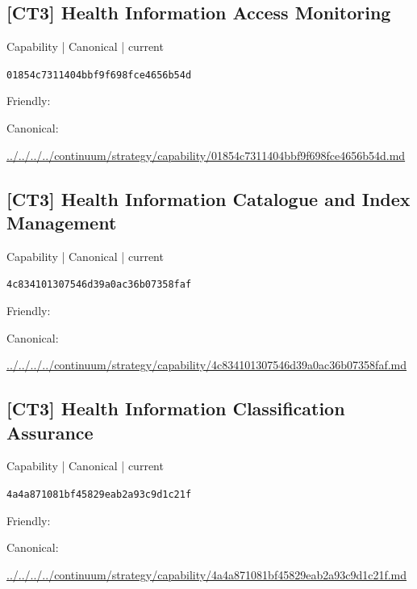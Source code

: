 \documentclass[10pt,a4paper]{article}
\begin{document}
\subsection*{[CT3] Health Information Access Monitoring}
{\small Capability | Canonical | current}\par
\texttt{01854c7311404bbf9f698fce4656b54d}\par
Friendly: \par
Canonical: \par
{\footnotesize\url{../../../../continuum/strategy/capability/01854c7311404bbf9f698fce4656b54d.md}}\par
\subsection*{[CT3] Health Information Catalogue and Index Management}
{\small Capability | Canonical | current}\par
\texttt{4c834101307546d39a0ac36b07358faf}\par
Friendly: \par
Canonical: \par
{\footnotesize\url{../../../../continuum/strategy/capability/4c834101307546d39a0ac36b07358faf.md}}\par
\subsection*{[CT3] Health Information Classification Assurance}
{\small Capability | Canonical | current}\par
\texttt{4a4a871081bf45829eab2a93c9d1c21f}\par
Friendly: \par
Canonical: \par
{\footnotesize\url{../../../../continuum/strategy/capability/4a4a871081bf45829eab2a93c9d1c21f.md}}\par
\end{document}
